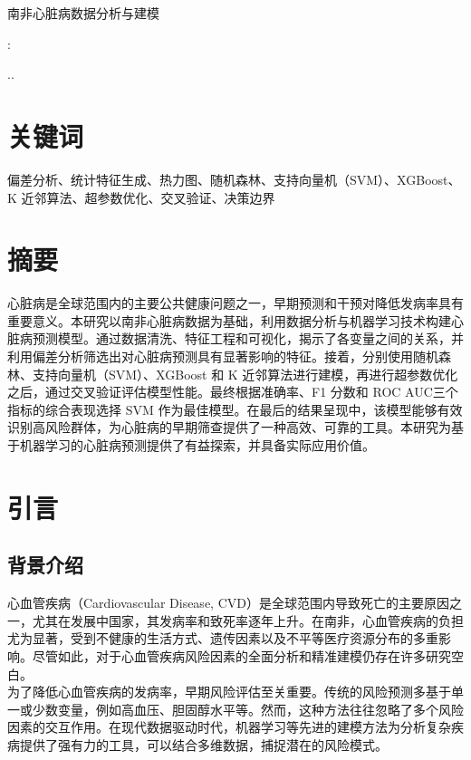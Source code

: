 \documentclass[UTF8]{article}
\begin{document}
	\pagestyle{empty}
	\vspace*{8em}
	\begin{center}
		{\Huge 南非心脏病数据分析与建模}\\
		\bigskip  %
	\end{center}
	\vspace{8em}  %
	\begin{center}
		{\Large  %
			
			:\underline{}\\
		}
	\end{center}
	\vspace{20em}  %
	\begin{center}
		
		\the\year.\the\month.\the\day
	\end{center}
	\clearpage  
	\newpage
	\setcounter{page}{0}
	\begin{center}
		\tableofcontents
	\end{center}
	
	
	\newpage
	\pagestyle{fancy}	
	\section{关键词}
	偏差分析、统计特征生成、热力图、随机森林、支持向量机（SVM）、XGBoost、K 近邻算法、超参数优化、交叉验证、决策边界
	\section{摘要}
	心脏病是全球范围内的主要公共健康问题之一，早期预测和干预对降低发病率具有重要意义。本研究以南非心脏病数据为基础，利用数据分析与机器学习技术构建心脏病预测模型。通过数据清洗、特征工程和可视化，揭示了各变量之间的关系，并利用偏差分析筛选出对心脏病预测具有显著影响的特征。接着，分别使用随机森林、支持向量机（SVM）、XGBoost 和 K 近邻算法进行建模，再进行超参数优化之后，通过交叉验证评估模型性能。最终根据准确率、F1 分数和 ROC AUC三个指标的综合表现选择 SVM 作为最佳模型。在最后的结果呈现中，该模型能够有效识别高风险群体，为心脏病的早期筛查提供了一种高效、可靠的工具。本研究为基于机器学习的心脏病预测提供了有益探索，并具备实际应用价值。
	\section{引言}
	\subsection{背景介绍}
	心血管疾病（Cardiovascular Disease, CVD）是全球范围内导致死亡的主要原因之一，尤其在发展中国家，其发病率和致死率逐年上升。在南非，心血管疾病的负担尤为显著，受到不健康的生活方式、遗传因素以及不平等医疗资源分布的多重影响。尽管如此，对于心血管疾病风险因素的全面分析和精准建模仍存在许多研究空白。\\
	\indent 为了降低心血管疾病的发病率，早期风险评估至关重要。传统的风险预测多基于单一或少数变量，例如高血压、胆固醇水平等。然而，这种方法往往忽略了多个风险因素的交互作用。在现代数据驱动时代，机器学习等先进的建模方法为分析复杂疾病提供了强有力的工具，可以结合多维数据，捕捉潜在的风险模式。\\
\end{document}
